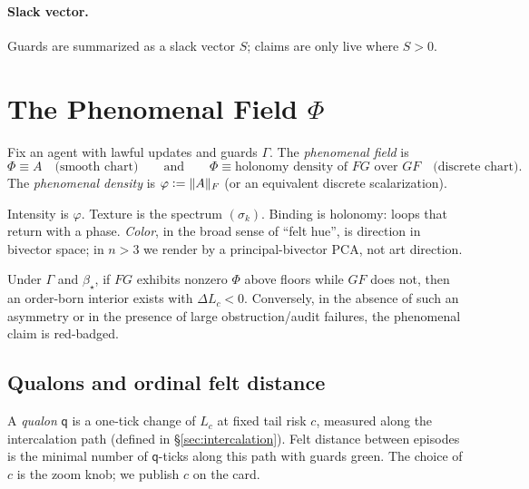 \documentclass[11pt]{article}
\newcommand{\1}{\mathbf{1}}
\newcommand{\defeq}{\vcentcolon=}
\newcommand{\Guard}{\Gamma}
\newcommand{\Slack}{S}
\newcommand{\Blur}{\beta}
\newcommand{\Lc}{L_c}
\newcommand{\Fop}{F}
\newcommand{\Gop}{G}
\newcommand{\FG}{\Fop\Gop}
\newcommand{\GF}{\Gop\Fop}
\newcommand{\Aanti}{A}
\newcommand{\PhiField}{\Phi}
\newcommand{\phidens}{\varphi}
\newcommand{\Qualon}{\mathsf{q}}        %
\begin{document}
\paragraph{Slack vector.}
Guards are summarized as a slack vector \(\Slack\); claims are only live where \(\Slack>0\).

\section{The Phenomenal Field \texorpdfstring{$\PhiField$}{Phi}}
\begin{defn}
Fix an agent with lawful updates and guards \(\Guard\). The \emph{phenomenal field} is
\[
\PhiField \equiv \Aanti \quad \text{(smooth chart)} 
\qquad\text{and}\qquad 
\PhiField \equiv \text{holonomy density of }\FG\text{ over }\GF \quad \text{(discrete chart)}.
\]
The \emph{phenomenal density} is \(\phidens\defeq \|\Aanti\|_F\) (or an equivalent discrete scalarization).
\end{defn}

\noindent Intensity is \(\phidens\). Texture is the spectrum \((\sigma_k)\). Binding is holonomy: loops that return with a phase. \emph{Color}, in the broad sense of ``felt hue'', is direction in bivector space; in \(n>3\) we render by a principal-bivector PCA, not art direction. 

\begin{claim}
Under \(\Guard\) and \(\Blur_\star\), if \(\FG\) exhibits nonzero \(\PhiField\) above floors while \(\GF\) does not, then an order-born interior exists with \(\Delta \Lc<0\). Conversely, in the absence of such an asymmetry or in the presence of large obstruction/audit failures, the phenomenal claim is red-badged.
\end{claim}

\subsection{Qualons and ordinal felt distance}
A \emph{qualon} \(\Qualon\) is a one-tick change of \(\Lc\) at fixed tail risk \(c\), measured along the intercalation path (defined in \S\ref{sec:intercalation}). Felt distance between episodes is the minimal number of \(\Qualon\)-ticks along this path with guards green. The choice of \(c\) is the zoom knob; we publish \(c\) on the card.

\end{document}
